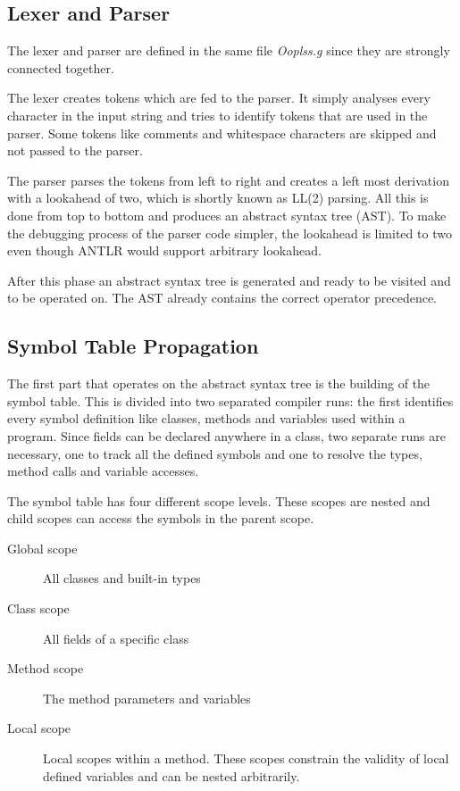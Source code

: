 \subsection{Lexer and Parser}
The lexer and parser are defined in the same file \emph{Ooplss.g}
since they are strongly connected together.

The lexer creates tokens which are fed to the parser. It simply
analyses every character in the input string and tries to identify tokens
that are used in the parser. Some tokens like comments and whitespace characters
are skipped and not passed to the parser.

The parser parses the tokens from left to right and creates a left most
derivation with a lookahead of two, which is shortly known as LL(2) parsing.
All this is done from top to bottom and produces an
abstract syntax tree (AST). To make the debugging process of the parser code simpler, 
the lookahead is limited to two even though ANTLR would support arbitrary 
lookahead.

After this phase an abstract syntax tree is generated and ready to be visited
and to be operated on. The AST already contains the correct operator precedence.

\subsection{Symbol Table Propagation}
The first part that operates on the abstract syntax tree is the building of
the symbol table. This is divided into two separated compiler runs: the
first identifies every symbol definition like classes, methods and
variables used within a program. Since fields can be declared anywhere
in a class, two separate runs are necessary, one to track all the defined
symbols and one to resolve the types, method calls and variable accesses.

The symbol table has four different scope levels. These scopes are nested
and child scopes can access the symbols in the parent scope.
\begin{description}
	\item[Global scope] All classes and built-in types
	\item[Class scope] All fields of a specific class
	\item[Method scope] The method parameters and variables
	\item[Local scope] Local scopes within a method. These scopes
	constrain the validity of local defined variables and can be
	nested arbitrarily.
\end{description}

